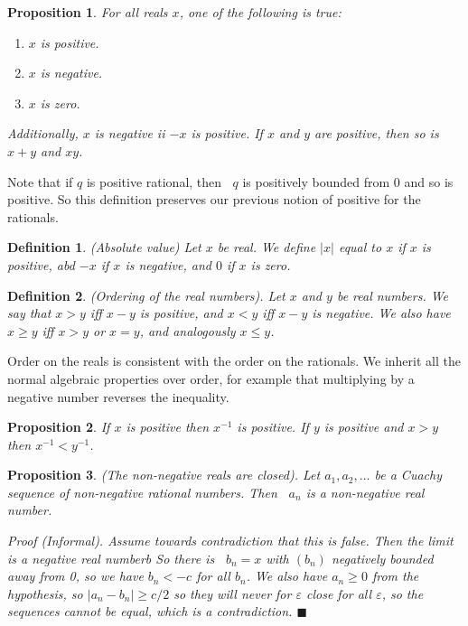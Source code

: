\documentclass{article}
\newtheorem{definition}{Definition}[subsection]
\newtheorem{proposition}{Proposition}[subsection]
\newcommand{\vep}{\varepsilon} %
\DeclareMathOperator{\infLIM}{\mathrm{LIM}_{n \to \infty}}
\let\it\textit
\begin{document}
\begin{proposition}
	For all reals $x$, one of the following is true:
	\begin{enumerate}[label=\alph*]
		\item $x$ is positive.
		\item $x$ is negative.
		\item $x$ is zero.
	\end{enumerate}
	Additionally, $x$ is negative ii $-x$ is 
	positive. If $x$ and $y$ are positive, 
	then so is $x+y$ and $xy$.
\end{proposition}

Note that if $q$ is positive rational, then $\infLIM q$ 
is positively bounded from $0$ and so is positive. So 
this definition preserves our previous notion of 
positive for the rationals.


\begin{definition}
	(Absolute value) Let $x$ be real. We 
	define $|x|$ equal to $x$ if $x$ is positive,
	abd $-x$ if $x$ is negative, and $0$ if 
	$x$ is zero. 
\end{definition}

\begin{definition}
	(Ordering of the real numbers). Let $x$ and $y$ 
	be real numbers. We say that $x >y$ iff 
	$x -y $ is positive, and $x< y$ iff 
	$x -y $ is negative. We also 
	have $x \geq y$ iff $x > y$ or $x = y$, 
	and analogously $x \leq y$.
\end{definition}

Order on the reals is consistent with the order on the
rationals. We inherit all the normal algebraic properties
over order, for example that multiplying by a negative 
number reverses the inequality.

\begin{proposition}
	If $x$ is positive then $x^{-1}$ is positive.
	If $y$ is positive and $x > y$ then $x^{-1} < y^{-1}$.
\end{proposition}

\begin{proposition}
	(The non-negative reals are closed). Let 
	$a_1, a_2, \dots$ be a Cuachy sequence of non-negative 
	rational numbers. Then $\infLIM a_n$ is a
	non-negative real number.

	\it{Proof} (Informal). Assume towards 
	contradiction that this is false. 
	Then the limit is a negative real 
	numberb So there is $\infLIM b_n = x$ 
	with $(b_n)$ negatively bounded away from
	0, so we have $b_n < -c$ for all $b_n$. 
	We also have $a_n \geq 0$ from the 
	hypothesis, so $|a_n - b_n| \geq c/2$ 
	so they will never for $\vep$ close 
	for all $\vep$, so the sequences 
	cannot be equal, which is 
	a contradiction. \hfill $\blacksquare$
\end{proposition}
\end{document}
